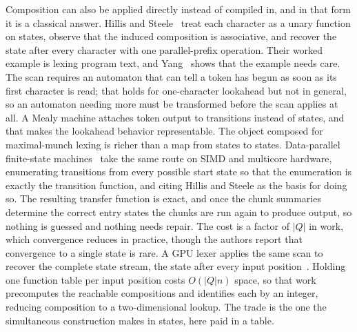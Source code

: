 \documentclass[11pt,a4paper]{article}
\theoremstyle{definition}
\theoremstyle{plain}
\begin{document}
Composition can also be applied directly instead of compiled in, and in that form it is a classical answer. Hillis and
Steele~\cite{hillis1986dataparallel} treat each character as a unary function on states, observe that the induced
composition is associative, and recover the state after every character with one parallel-prefix operation. Their worked
example is lexing program text, and Yang~\cite{yang1996mealy} shows that the example needs care. The scan requires an
automaton that can tell a token has begun as soon as its first character is read; that holds for one-character lookahead
but not in general, so an automaton needing more must be transformed before the scan applies at all. A Mealy machine
attaches token output to transitions instead of states, and that makes the lookahead behavior representable. The object
composed for maximal-munch lexing is richer than a map from states to states. Data-parallel finite-state
machines~\cite{mytkowicz2014dpfsm} take the same route on SIMD and multicore hardware, enumerating transitions from
every possible start state so that the enumeration is exactly the transition function, and citing Hillis and Steele as
the basis for doing so. The resulting transfer function is exact, and once the chunk summaries determine the correct
entry states the chunks are run again to produce output, so nothing is guessed and nothing needs repair. The cost is a
factor of $|Q|$ in work, which convergence reduces in practice, though the authors report that convergence to a single
state is rare. A GPU lexer applies the same scan to recover the complete state stream, the state after every input
position~\cite{voetter2021gpu}. Holding one function table per input position costs $O(|Q|n)$ space, so that work
precomputes the reachable compositions and identifies each by an integer, reducing composition to a two-dimensional
lookup. The trade is the one the simultaneous construction makes in states, here paid in a table.
\end{document}
